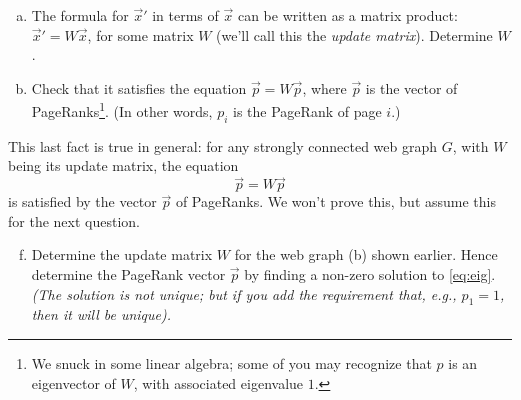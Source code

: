 \documentclass[11pt]{article}
\begin{document}
\begin{enumerate}[(a)]
\item The formula for $\vec{x}'$ in terms of $\vec{x}$ can be written as a matrix product: $\vec{x}' = W\vec{x}$, for some matrix $W$ (we'll call this the \emph{update matrix}). Determine $W$.
    \solution{
    \[ W = \begin{pmatrix} 0 & 0 & 1/2\\ 1/2 & 0 & 1/2\\ 1/2 & 1 & 0 \end{pmatrix}. \] }
\item Check that it satisfies the equation $\vec{p} = W\vec{p}$, where $\vec{p}$ is the vector of PageRanks\footnote{We snuck in some linear algebra; some of you may recognize that $p$ is an eigenvector of $W$, with associated eigenvalue $1$.}. (In other words, $p_i$ is the PageRank of page $i$.)
\end{enumerate}
This last fact is true in general: for any strongly connected web graph $G$, with $W$ being its update matrix, the equation
\begin{equation}\label{eq:eig} \vec{p} = W\vec{p} \end{equation}
is satisfied by the vector $\vec{p}$ of PageRanks. We won't prove this, but assume this for the next question.

\begin{center}
\end{center}
\begin{enumerate}[(a)]
        \setcounter{enumi}{5}

    \item Determine the update matrix $W$ for the web graph (b) shown earlier. Hence determine the PageRank vector $\vec{p}$ by finding a non-zero solution to \eqref{eq:eig}. \emph{(The solution is not unique; but if you add the requirement that, e.g., $p_1 = 1$, then it will be unique).}
\end{enumerate}
\end{document}
